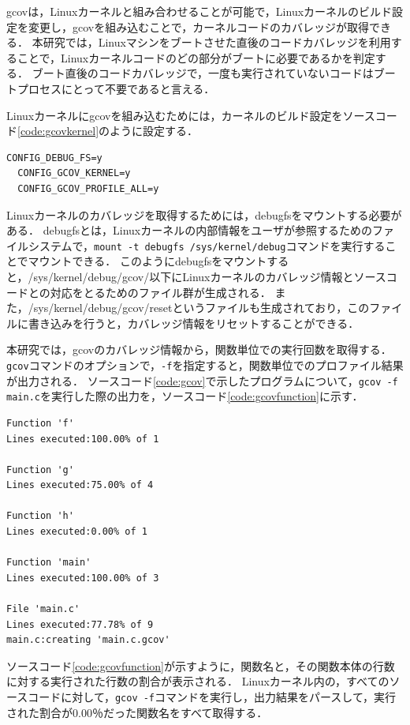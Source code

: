 \documentclass[graduation-thesis]{mlarticle}
\begin{document}
gcovは，Linuxカーネルと組み合わせることが可能で，Linuxカーネルのビルド設定を変更し，gcovを組み込むことで，カーネルコードのカバレッジが取得できる．
本研究では，Linuxマシンをブートさせた直後のコードカバレッジを利用することで，Linuxカーネルコードのどの部分がブートに必要であるかを判定する．
ブート直後のコードカバレッジで，一度も実行されていないコードはブートプロセスにとって不要であると言える．

Linuxカーネルにgcovを組み込むためには，カーネルのビルド設定をソースコード\ref{code:gcovkernel}のように設定する．

\begin{lstlisting}[caption=gcovを組み込むLinuxカーネルの設定, label=code:gcovkernel]
  CONFIG_DEBUG_FS=y
  CONFIG_GCOV_KERNEL=y
  CONFIG_GCOV_PROFILE_ALL=y
\end{lstlisting}

Linuxカーネルのカバレッジを取得するためには，debugfsをマウントする必要がある．
debugfsとは，Linuxカーネルの内部情報をユーザが参照するためのファイルシステムで，\texttt{mount -t debugfs /sys/kernel/debug}コマンドを実行することでマウントできる．
このようにdebugfsをマウントすると，/sys/kernel/debug/gcov/以下にLinuxカーネルのカバレッジ情報とソースコードとの対応をとるためのファイル群が生成される．
また，/sys/kernel/debug/gcov/resetというファイルも生成されており，このファイルに書き込みを行うと，カバレッジ情報をリセットすることができる．

本研究では，gcovのカバレッジ情報から，関数単位での実行回数を取得する．
\texttt{gcov}コマンドのオプションで，\texttt{-f}を指定すると，関数単位でのプロファイル結果が出力される．
ソースコード\ref{code:gcov}で示したプログラムについて，\texttt{gcov -f main.c}を実行した際の出力を，ソースコード\ref{code:gcovfunction}に示す．

\begin{lstlisting}[caption=関数単位でのプロファイル結果, label=code:gcovfunction]
% gcov -f main.c
Function 'f'
Lines executed:100.00% of 1

Function 'g'
Lines executed:75.00% of 4

Function 'h'
Lines executed:0.00% of 1

Function 'main'
Lines executed:100.00% of 3

File 'main.c'
Lines executed:77.78% of 9
main.c:creating 'main.c.gcov'
\end{lstlisting}

ソースコード\ref{code:gcovfunction}が示すように，関数名と，その関数本体の行数に対する実行された行数の割合が表示される．
Linuxカーネル内の，すべてのソースコードに対して，\texttt{gcov -f}コマンドを実行し，出力結果をパースして，実行された割合が0.00％だった関数名をすべて取得する．
\end{document}

